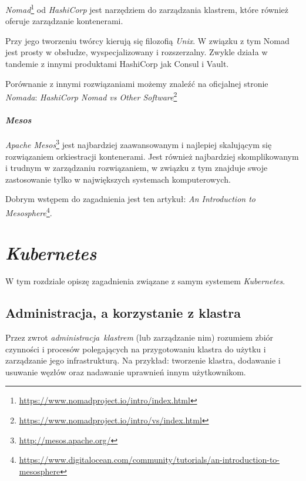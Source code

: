 \documentclass[a4paper,12pt,twoside,openany]{report}
\DeclareRobustCommand{\href}[2]{#2\footnote{\url{#1}}}
\begin{document}
\href{https://www.nomadproject.io/intro/index.html}{\emph{Nomad}} od
\emph{HashiCorp} jest narzędziem do zarządzania klastrem, które również
oferuje zarządzanie kontenerami.

Przy jego tworzeniu twórcy kierują się filozofią \emph{Unix}. W związku
z tym Nomad jest prosty w obsłudze, wyspecjalizowany i rozszerzalny.
Zwykle działa w tandemie z innymi produktami HashiCorp jak Consul i
Vault.

Porównanie z innymi rozwiązaniami możemy znaleźć na oficjalnej stronie
\emph{Nomada}:
\href{https://www.nomadproject.io/intro/vs/index.html}{\emph{HashiCorp
Nomad vs Other Software}}

\hypertarget{mesos}{%
\subsubsection{\texorpdfstring{\emph{Mesos}}{Mesos}}\label{mesos}}

\href{http://mesos.apache.org/}{\emph{Apache Mesos}} jest najbardziej
zaawansowanym i najlepiej skalującym się rozwiązaniem orkiestracji
kontenerami. Jest również najbardziej skomplikowanym i trudnym w
zarządzaniu rozwiązaniem, w związku z tym znajduje swoje zastosowanie
tylko w największych systemach komputerowych.

Dobrym wstępem do zagadnienia jest ten artykuł:
\href{https://www.digitalocean.com/community/tutorials/an-introduction-to-mesosphere}{\emph{An
Introduction to Mesosphere}}.

\hypertarget{kubernetes-1}{%
\chapter{\texorpdfstring{\emph{Kubernetes}}{Kubernetes}}\label{kubernetes-1}}

W tym rozdziale opiszę zagadnienia związane z samym systemem
\emph{Kubernetes}.

\hypertarget{administracja-a-korzystanie-z-klastra}{%
\section{Administracja, a korzystanie z
klastra}\label{administracja-a-korzystanie-z-klastra}}

Przez zwrot \emph{administracja~klastrem} (lub zarządzanie nim) rozumiem
zbiór czynności i procesów polegających na przygotowaniu klastra do
użytku i zarządzanie jego infrastrukturą. Na przykład: tworzenie
klastra, dodawanie i usuwanie węzłów oraz nadawanie uprawnień innym
użytkownikom.
\end{document}

